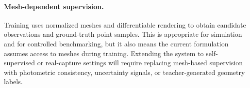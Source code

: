 \paragraph{Mesh-dependent supervision.}
Training uses normalized meshes and differentiable rendering to obtain candidate observations and ground-truth point samples. This is appropriate for simulation and for controlled benchmarking, but it also means the current formulation assumes access to meshes during training. Extending the system to self-supervised or real-capture settings will require replacing mesh-based supervision with photometric consistency, uncertainty signals, or teacher-generated geometry labels.
